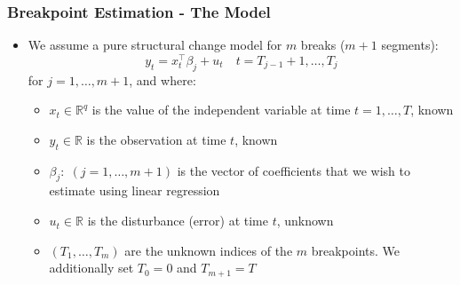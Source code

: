 \documentclass[9pt]{beamer}
\begin{document}
\begin{frame}
\frametitle{Breakpoint Estimation - The Model}
\begin{itemize}
  \item 
We assume a pure structural change model for $m$ breaks ($m+1$ segments):
\[
y_{t} = x_{t}^{\top} \beta_{j}+u_{t} \quad t=T_{j-1}+1, \ldots, T_{j}
\]
for $j = 1,\hdots , m+1$, and where:
\begin{itemize}
\item $x_t \in \mathbb{R}^q$ is the value of the independent variable at time
  $t = 1,\hdots , T$, known
\item $y_{t} \in \mathbb{R}$ is the observation at time $t$, known
\item $\beta_j: \; (j=1, \hdots ,m+1)$ is the vector of coefficients that
  we wish to estimate using linear regression 
\item $u_{t} \in \mathbb{R}$ is the disturbance (error) at time $t$, unknown
\item $(T_1, \hdots ,T_m)$ are the unknown indices of the $m$ breakpoints.
 We additionally set $T_0 = 0$ and $T_{m+1} = T$
\end{itemize}
\end{itemize}
\end{frame}
\end{document}
